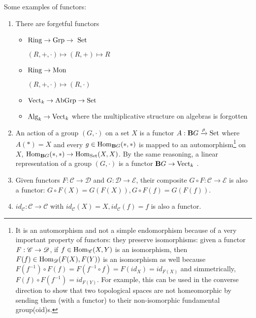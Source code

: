 \begin{ex}
\label{ex:functor}
Some examples of functors:
    \begin{enumerate}
        \item\label{ForgetfulFunctors} There are forgetful functors \begin{itemize}
            \item $\Ring\rightarrow \Grp\rightarrow\ \Set$
            
            \noindent $(R,+,\cdot)\mapsto(R,+)\mapsto R$
            \item $\operatorname{Ring}\rightarrow \operatorname{Mon}$ 
            
            \noindent $(R,+,\cdot)\mapsto(R,\cdot)$
            \item $\operatorname{Vect}_{k}\rightarrow \operatorname{AbGrp}\rightarrow \operatorname{Set}$

            \item $\operatorname{Alg}_k\to \operatorname{Vect}_k$ where the multiplicative structure on algebras is forgotten
        \end{itemize}
        \item\label{Representations of Groups} An action of a group $(G,\cdot)$ on a set $X$ is a functor $A: \mathbf{B}G\xrightarrow{\rho} \operatorname{Set}$ where $A(\ast)=X$ and every $g\in \operatorname{Hom}_{\mathbf{B}G}(\ast,\ast)$ is mapped to an automorphism\footnote{It is an automorphism and not a simple endomorphism because of a very important property of functors: they preserve isomorphisms: given a functor $F:\mathscr{C}\to\mathscr{D}$, if $f\in \operatorname{Hom}_{\mathscr{C}}(X,Y)$ is an isomorphism, then $F(f)\in \operatorname{Hom}_{\mathscr{D}}(F(X),F(Y))$ is an isomorphism as well because $F(f^{-1})\circ F(f)=F(f^{-1}\circ f)=F(id_X)=id_{F(X)}$ and simmetrically, $F(f)\circ F(f^{-1})=id_{F(Y)}$. For example, this can be used in the converse direction to show that two topological spaces are not homeomorphic by sending them (with a functor) to their non-isomorphic fundamental group(oid)s.} on $X$, $\operatorname{Hom}_{\mathbf{B}G}(\ast,\ast)\rightarrow \operatorname{Hom}_{\operatorname{Set}}(X,X)$. By the same reasoning, a linear representation of a group $(G,\cdot)$ is a functor $\mathbf{B}G\rightarrow \operatorname{Vect}_k$ .
        \item Given functors $F:\mathscr{C}\rightarrow\mathscr{D}$ and $G:\mathscr{D}\rightarrow\mathscr{E}$, their composite $G\circ F:\mathscr{C}\rightarrow\mathscr{E}$ is also a functor: $G\circ F(X)=G(F(X)), G\circ F(f)=G(F(f))$.
        \item $id_{\mathscr{C}}:\mathscr{C}\rightarrow\mathscr{C}$  with $id_{\mathscr{C}}(X)=X, id_{\mathscr{C}}(f)=f$ is also a functor.
    \end{enumerate}
\end{ex}
